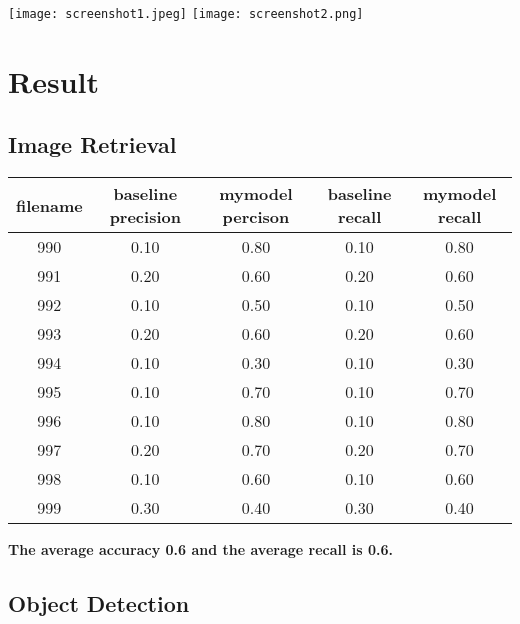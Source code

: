 \documentclass[12pt]{article}
\begin{document}
\texttt{[image: screenshot1.jpeg]}
\texttt{[image: screenshot2.png]}

\section*{Result}

\subsection*{Image Retrieval}

\begin{center}
\begin{tabular}{|c|c|c|c|c|}
\hline  
filename & baseline precision & mymodel percison & baseline recall & mymodel recall\\
\hline
990 & 0.10 & 0.80 & 0.10 & 0.80\\
\hline
991 & 0.20 & 0.60 & 0.20 & 0.60\\
\hline
992 & 0.10 & 0.50 & 0.10 & 0.50\\
\hline
993 & 0.20 & 0.60 & 0.20 & 0.60\\
\hline
994 & 0.10 & 0.30 & 0.10 & 0.30\\
\hline
995 & 0.10 & 0.70 & 0.10 & 0.70\\
\hline
996 & 0.10 & 0.80 & 0.10 & 0.80\\
\hline
997 & 0.20 & 0.70 & 0.20 & 0.70\\
\hline
998 & 0.10 & 0.60 & 0.10 & 0.60\\
\hline
999 & 0.30 & 0.40 & 0.30 & 0.40\\
\hline
\end{tabular}
\end{center}

\textbf{The average accuracy 0.6 and the average recall is 0.6.}

\subsection*{Object Detection}
\end{document}

